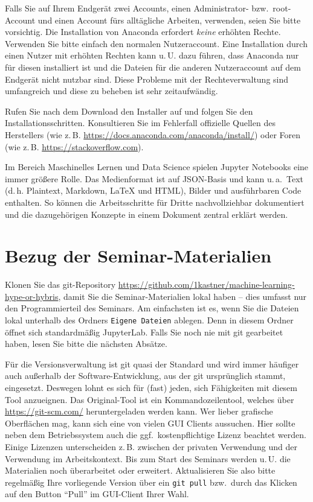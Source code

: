 \documentclass{tufte-handout}
\begin{document}
Falls Sie auf Ihrem Endgerät zwei Accounts, einen Administrator- bzw.\ root-Account und einen Account fürs alltägliche Arbeiten, verwenden, seien Sie bitte vorsichtig.
Die Installation von Anaconda erfordert \emph{keine} erhöhten Rechte.
Verwenden Sie bitte einfach den normalen Nutzeraccount.
Eine Installation durch einen Nutzer mit erhöhten Rechten  kann u.\,U. dazu führen, dass Anaconda nur für diesen  installiert ist und die Dateien für die anderen Nutzeraccount auf dem Endgerät nicht nutzbar sind.
Diese Probleme mit der Rechteverwaltung sind umfangreich und diese zu beheben ist sehr zeitaufwändig.

Rufen Sie nach dem Download den Installer auf und folgen Sie den Installationsschritten.
Konsultieren Sie im Fehlerfall offizielle Quellen des Herstellers (wie z.\,B. \url{https://docs.anaconda.com/anaconda/install/})
oder Foren (wie z.\,B. \url{https://stackoverflow.com}).


Im Bereich Maschinelles Lernen und Data Science spielen Jupyter Notebooks eine immer größere Rolle.
Das Medienformat ist auf JSON-Basis und kann u.\,a.\
Text (d.\,h. Plaintext, Markdown, LaTeX und HTML),
Bilder und
ausführbaren Code enthalten.
So können die Arbeitsschritte für Dritte nachvollziehbar dokumentiert und die dazugehörigen Konzepte in einem Dokument zentral erklärt werden.


\section{Bezug der Seminar-Materialien}
\label{sec:git-clone}

Klonen Sie das git-Repository
\url{https://github.com/1kastner/machine-learning-hype-or-hybris},
damit Sie die Seminar-Materialien lokal haben -- dies umfasst nur den Programmierteil des Seminars.
Am einfachsten ist es, wenn Sie die Dateien lokal unterhalb des Ordners \texttt{Eigene Dateien} ablegen.
Denn in diesem Ordner öffnet sich standardmäßig JupyterLab.
Falls Sie noch nie mit git gearbeitet haben, lesen Sie bitte die nächsten Absätze.

Für die Versionsverwaltung ist git quasi der Standard und wird immer häufiger auch außerhalb der Software-Entwicklung, aus der git ursprünglich stammt, eingesetzt.
Deswegen lohnt es sich für (fast) jeden, sich Fähigkeiten mit diesem Tool anzueignen.
Das Original-Tool ist ein Kommandozeilentool, welches über \url{https://git-scm.com/} heruntergeladen werden kann.
Wer lieber grafische Oberflächen mag, kann sich eine von vielen GUI Clients%
aussuchen.
Hier sollte neben dem Betriebssystem auch die ggf.\ kostenpflichtige Lizenz beachtet werden.
Einige Lizenzen unterscheiden z.\,B. zwischen der privaten Verwendung und der Verwendung im Arbeitskontext.
Bis zum Start des Seminars werden u.\,U. die Materialien noch überarbeitet oder erweitert.
Aktualisieren Sie also bitte regelmäßig Ihre vorliegende Version über ein \texttt{git pull} bzw.\ durch das Klicken auf den Button \enquote{Pull} im GUI-Client Ihrer Wahl.
\end{document}
